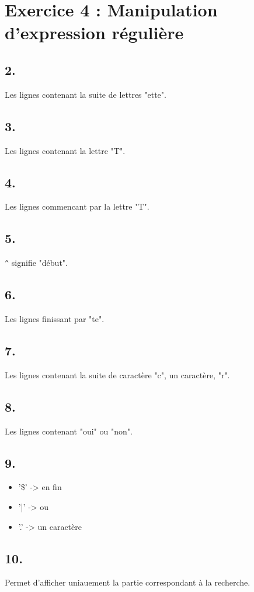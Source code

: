     \section{Exercice 4 : Manipulation d'expression régulière}
        \subsection{2.}
            Les lignes contenant la suite de lettres "ette".
        \subsection{3.}
            Les lignes contenant la lettre "T".
        \subsection{4.}
            Les lignes commencant par la lettre "T".
        \subsection{5.}
            \texttt{\^} signifie "début".
        \subsection{6.}
            Les lignes finissant par "te".
        \subsection{7.}
            Les lignes contenant la suite de caractère "c", un caractère, "r".
        \subsection{8.}
            Les lignes contenant "oui" ou "non".
        \subsection{9.}
            \begin{itemize}
                \item '\$' -> en fin
                \item '|' -> ou
                \item '.' -> un caractère
            \end{itemize}
        \subsection{10.}
            Permet d'afficher uniauement la partie correspondant à la recherche.
